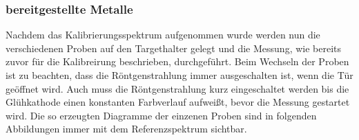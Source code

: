 \documentclass[12pt,english,ngerman]{scrartcl}
\begin{document}
\subsubsection{bereitgestellte Metalle}

Nachdem das Kalibrierungsspektrum aufgenommen wurde werden nun die verschiedenen Proben auf den Targethalter gelegt 
und die Messung, wie bereits zuvor für die Kalibreirung beschrieben, durchgeführt. Beim Wechseln der Proben ist zu beachten, 
dass die Röntgenstrahlung immer ausgeschalten ist, wenn die Tür geöffnet wird. Auch muss die Röntgenstrahlung kurz 
eingeschaltet werden bis die Glühkathode einen konstanten Farbverlauf aufweißt, bevor die Messung gestartet wird.
Die so erzeugten Diagramme der einzenen Proben sind in folgenden Abbildungen immer mit dem Referenzspektrum sichtbar.

\begin{figure}[H]
	\centering
	 \hfill
\end{figure}
\end{document}

